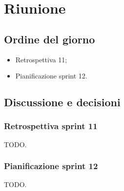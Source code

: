 \section{Riunione}
\subsection{Ordine del giorno}
\begin{itemize}
	\item Retrospettiva  11;
	\item Pianificazione sprint 12.
\end{itemize}

\subsection{Discussione e decisioni}
\subsubsection{Retrospettiva sprint 11}
\par TODO.

\subsubsection{Pianificazione sprint 12}
\par TODO.